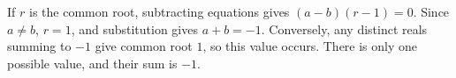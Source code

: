 If $r$ is the common root, subtracting equations gives $(a-b)(r-1)=0$. Since $a\ne b$, $r=1$, and substitution gives $a+b=-1$. Conversely, any distinct reals summing to $-1$ give common root $1$, so this value occurs. There is only one possible value, and their sum is $\boxed{-1}$.
